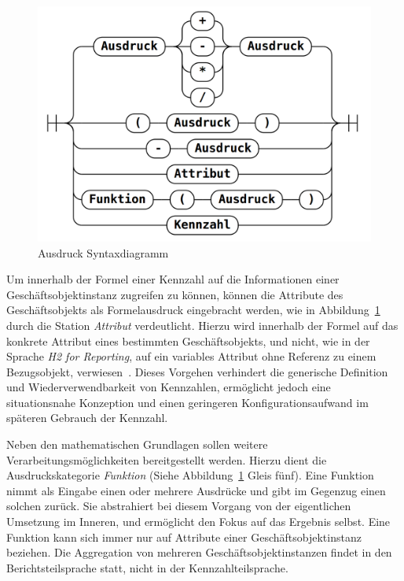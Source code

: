 \documentclass[
  language=german, %
  type=bachelor,%
  ngerman
]{isthesis}
\begin{document}
\begin{content}

  \begin{figure}
    \includegraphics[scale=0.25]{content/figures/railroad-kennzahl.png}
    \caption[Ausdruck Syntaxdiagramm]{Ausdruck Syntaxdiagramm \protect\footnotemark}\label{railroad-kennzahl}
  \end{figure}
	
  Um innerhalb der Formel einer Kennzahl auf die Informationen einer
  Geschäftsobjektinstanz zugreifen zu können, können die Attribute des
  Geschäftsobjekts als Formelausdruck eingebracht werden, wie in
  Abbildung~\ref{railroad-kennzahl} durch die Station \textit{Attribut}
  verdeutlicht. Hierzu wird innerhalb der Formel auf das konkrete Attribut
  eines bestimmten Geschäftsobjekts, und nicht, wie in der Sprache \textit{H2
  for Reporting}, auf ein variables Attribut ohne Referenz zu einem
  Bezugsobjekt, verwiesen~\cite[][S.  20]{becker2007h2}. Dieses Vorgehen
  verhindert die generische Definition und Wiederverwendbarkeit von Kennzahlen,
  ermöglicht jedoch eine situationsnahe Konzeption und einen geringeren
  Konfigurationsaufwand im späteren Gebrauch der Kennzahl.

  Neben den mathematischen Grundlagen sollen weitere Verarbeitungsmöglichkeiten
  bereitgestellt werden. Hierzu dient die Ausdruckskategorie \textit{Funktion}
  (Siehe Abbildung~\ref{railroad-kennzahl} Gleis fünf). Eine Funktion nimmt als
  Eingabe einen oder mehrere Ausdrücke und gibt im Gegenzug einen solchen
  zurück. Sie abstrahiert bei diesem Vorgang von der eigentlichen Umsetzung im
  Inneren, und ermöglicht den Fokus auf das Ergebnis selbst. Eine Funktion kann
  sich immer nur auf Attribute einer Geschäftsobjektinstanz beziehen. Die
  Aggregation von mehreren Geschäftsobjektinstanzen findet in den
  Berichtsteilsprache statt, nicht in der Kennzahlteilsprache.


\end{content}
\end{document}
